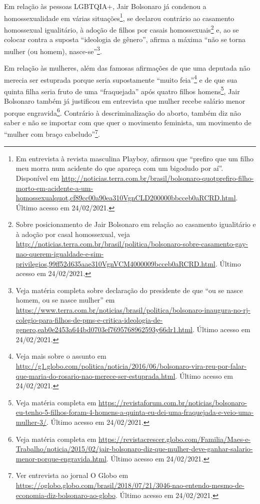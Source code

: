 \documentclass[
	12pt,				%
	openright,			%
	twoside,			%
	a4paper,			%
	english,			%
	brazil				%
	]{abntex2}
\begin{document}
\begin{anexosenv}
\begin{enumerate}
 Em relação às pessoas LGBTQIA+, Jair Bolsonaro já condenou a homossexualidade em várias situações\footnote{Em entrevista à revista masculina Playboy, afirmou que ``prefiro que um filho meu morra num acidente do que apareça com um bigodudo por aí''. Disponível em \url{http://noticias.terra.com.br/brasil/bolsonaro-quotprefiro-filho-morto-em-acidente-a-um-homossexualquot,cf89cc00a90ea310VgnCLD200000bbcceb0aRCRD.html}. Último acesso em 24/02/2021.}, se declarou contrário ao casamento homossexual igualitário, à adoção de filhos por casais homossexuais\footnote{Sobre posicionamento de Jair Bolsonaro em relação ao casamento igualitário e à adoção por casal homossexual, veja \url{http://noticias.terra.com.br/brasil/politica/bolsonaro-sobre-casamento-gay-nao-querem-igualdade-e-sim-privilegios,99ff52d635aae310VgnVCM4000009bcceb0aRCRD.html}. Último acesso em 24/02/2021.} e, ao se colocar contra a suposta ``ideologia de gênero'', afirma a máxima ``não se torna mulher (ou homem), nasce-se''\footnote{Veja matéria completa sobre declaração do presidente de que ``ou se nasce homem, ou se nasce mulher'' em \url{https://www.terra.com.br/noticias/brasil/politica/bolsonaro-inaugura-no-rj-colegio-para-filhos-de-pms-e-critica-ideologia-de-genero,eab0e2453a644bd0703ef7695768962593y66dr1.html}. Último acesso em 24/02/2021.}.
 
 Em relação às mulheres, além das famosas afirmações de que uma deputada não merecia ser estuprada porque seria supostamente ``muito feia''\footnote{Veja mais sobre o assunto em \url{http://g1.globo.com/politica/noticia/2016/06/bolsonaro-vira-reu-por-falar-que-maria-do-rosario-nao-merece-ser-estuprada.html}. Último acesso em 24/02/2021.} e de que sua quinta filha seria fruto de uma ``fraquejada'' após quatro filhos homens\footnote{Veja matéria completa em \url{https://revistaforum.com.br/noticias/bolsonaro-eu-tenho-5-filhos-foram-4-homens-a-quinta-eu-dei-uma-fraquejada-e-veio-uma-mulher-3/}. Último acesso em 24/02/2021.}, Jair Bolsonaro também já justificou em entrevista que mulher recebe salário menor porque engravida\footnote{Veja matéria completa em \url{https://revistacrescer.globo.com/Familia/Maes-e-Trabalho/noticia/2015/02/jair-bolsonaro-diz-que-mulher-deve-ganhar-salario-menor-porque-engravida.html}. Último acesso em 24/02/2021.}. Contrário à descriminalização do aborto, também diz não saber e não se importar com que quer o movimento feminista, um movimento de ``mulher com braço cabeludo''\footnote{Ver entrevista ao jornal O Globo em \url{https://oglobo.globo.com/brasil/2018/07/21/3046-nao-entendo-mesmo-de-economia-diz-bolsonaro-ao-globo}. Último acesso em 24/02/2021.}.
  

\end{enumerate}
\end{anexosenv}
\end{document}
